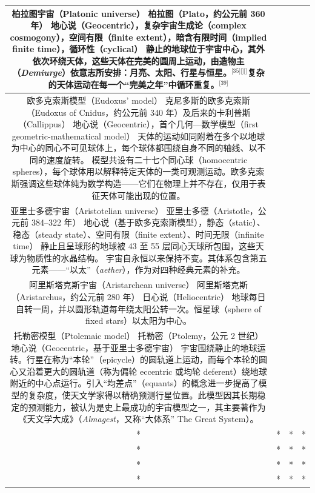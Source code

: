\begin{table}[ht]
\begin{tabular}{|c|c|c|c|}
\hline
柏拉图宇宙（Platonic universe） \quad 柏拉图（Plato，约公元前 360 年） \quad 地心说（Geocentric），复杂宇宙生成论（complex cosmogony），空间有限（finite extent），暗含有限时间（implied finite time），循环性（cyclical） \quad 静止的地球位于宇宙中心，其外依次环绕天体，这些天体在完美的圆周上运动，由造物主（\emph{Demiurge}）依意志所安排：月亮、太阳、行星与恒星。\(^\text{[35][][]}\)复杂的天体运动在每一个“完美之年”中循环重复。\(^\text{[39]}\)\\
\hline
欧多克索斯模型（Eudoxus' model） \quad 克尼多斯的欧多克索斯（Eudoxus of Cnidus，约公元前 340 年）及后来的卡利普斯（Callippus） \quad 地心说（Geocentric），首个几何—数学模型（first geometric-mathematical model） \quad 天体的运动如同附着在多个以地球为中心的同心不可见球体上，每个球体都围绕自身不同的轴线、以不同的速度旋转。\cite{ref40} 模型共设有二十七个同心球（homocentric spheres），每个球体用以解释特定天体的一类可观测运动。欧多克索斯强调这些球体纯为数学构造——它们在物理上并不存在，仅用于表征天体可能出现的位置。\cite{ref41}\\
\hline
亚里士多德宇宙（Aristotelian universe） \quad 亚里士多德（Aristotle，公元前 384–322 年） \quad 地心说（基于欧多克索斯模型），静态（static）、稳态（steady state）、空间有限（finite extent）、时间无限（infinite time） \quad 静止且呈球形的地球被 43 至 55 层同心天球所包围，这些天球为物质性的水晶结构。\cite{ref42} 宇宙自永恒以来保持不变。其体系包含第五元素——“以太”（\emph{aether}），作为对四种经典元素的补充。\cite{ref43}\\
\hline
阿里斯塔克斯宇宙（Aristarchean universe） \quad 阿里斯塔克斯（Aristarchus，约公元前 280 年） \quad 日心说（Heliocentric） \quad 地球每日自转一周，并以圆形轨道每年绕太阳公转一次。恒星球（sphere of fixed stars）以太阳为中心。\cite{ref44}\\
\hline
托勒密模型（Ptolemaic model） \quad 托勒密（Ptolemy，公元 2 世纪） \quad 地心说（Geocentric，基于亚里士多德宇宙） \quad 宇宙围绕静止的地球运转。行星在称为“本轮”（epicycle）的圆轨道上运动，而每个本轮的圆心又沿着更大的圆轨道（称为偏轮 eccentric 或均轮 deferent）绕地球附近的中心点运行。引入“均差点”（equants）的概念进一步提高了模型的复杂度，使天文学家得以精确预测行星位置。此模型因其长期稳定的预测能力，被认为是史上最成功的宇宙模型之一，其主要著作为《天文学大成》（\emph{Almagest}，又称“大体系” The Great System）。\\
\hline
* & * & * & * \\
\hline
* & * & * & * \\
\hline
* & * & * & * \\
\hline
* & * & * & * \\

\end{tabular}
\end{table}
